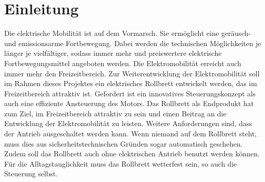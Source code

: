 \chapter{Einleitung}
Die elektrische Mobilität ist auf dem Vormarsch. Sie ermöglicht eine geräusch- und emissionsarme Fortbewegung. Dabei werden die technischen Möglichkeiten je länger je vielfältiger, sodass immer mehr und preiswertere elektrische Fortbewegungsmittel angeboten werden.
Die Elektromobilität erreicht auch immer mehr den Freizeitbereich.
Zur Weiterentwicklung der Elektromobilität soll im Rahmen dieses Projektes ein elektrisches Rollbrett entwickelt werden, das im Freizeitbereich attraktiv ist.
Gefordert ist ein innovatives Steuerungskonzept als auch eine effiziente Ansteuerung des Motors. Das Rollbrett als Endprodukt hat zum Ziel, im Freizeitbereich attraktiv zu sein und einen Beitrag an die Entwicklung der Elektromobilität zu leisten. Weitere Anforderungen sind, dass der Antrieb ausgeschaltet werden kann. Wenn niemand auf dem Rollbrett steht, muss dies aus sicherheitstechnischen Gründen sogar automatisch geschehen. Zudem soll das Rollbrett auch ohne elektrischen Antrieb benutzt werden können. Für die Alltagstauglichkeit muss das Rollbrett wetterfest sein, so auch die Steuerung selbst.\\

